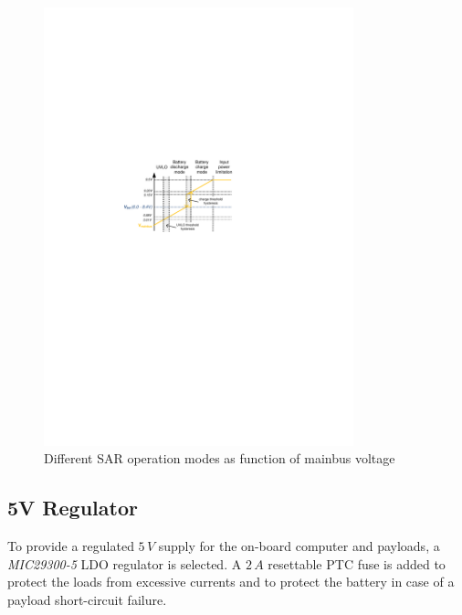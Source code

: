 \begin{figure}[H]
\centering
\includegraphics[width=0.8\textwidth]{figures/fig_CDR_SAR_ModeTransition}
\caption{Different SAR operation modes as function of mainbus voltage}
\label{fig:SAR_ModeTransition}
\end{figure}%
%
%
\subsection{5V Regulator}
To provide a regulated $5\,V$ supply for the on-board computer and payloads, a \textit{MIC29300-5} \ac{LDO} regulator is selected. A $2\,A$ resettable \ac{PTC} fuse is added to protect the loads from excessive currents and to protect the battery in case of a payload short-circuit failure.
%
